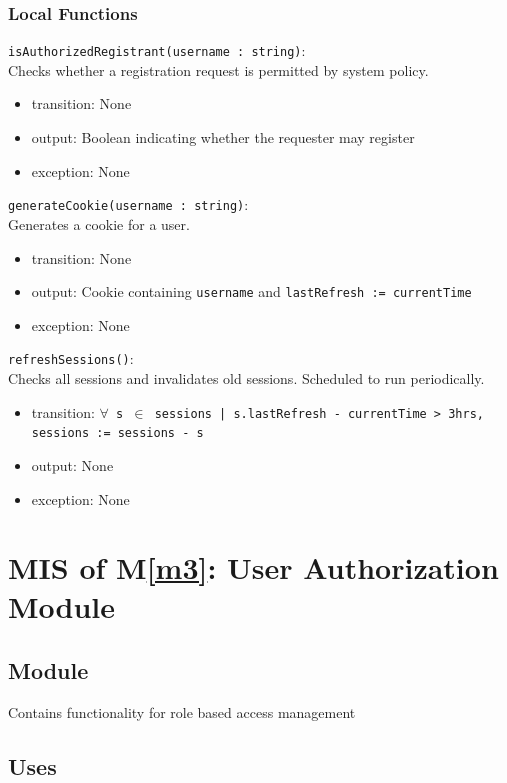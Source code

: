 \documentclass[12pt, titlepage]{article}
\begin{document}
\subsubsection{Local Functions}

\noindent \texttt{isAuthorizedRegistrant(username : string)}: \\
Checks whether a registration request is permitted by system policy.
\begin{itemize}
\item transition: None
\item output: Boolean indicating whether the requester may register
\item exception: None
\end{itemize}

\noindent \texttt{generateCookie(username : string)}: \\
Generates a cookie for a user.
\begin{itemize}
\item transition: None
\item output: Cookie containing \texttt{username} and \texttt{lastRefresh := currentTime}
\item exception: None
\end{itemize}

\noindent \texttt{refreshSessions()}: \\
Checks all sessions and invalidates old sessions. Scheduled to run periodically.
\begin{itemize}
\item transition: \texttt{$\forall$ s $\in$ sessions | s.lastRefresh - currentTime > 3hrs,  sessions := sessions - s}
\item output: None
\item exception: None
\end{itemize}

\newpage

\section{MIS of M\ref{m3}: User Authorization Module}

\subsection{Module}

Contains functionality for role based access management

\subsection{Uses}
\end{document}

